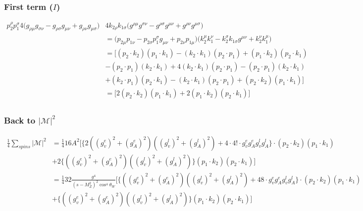 \documentclass[11pt]{article}
\begin{document}
\subsubsection{First term ($I$)}
\begin{align*} 
 p_2^{\rho} p_1^{\sigma} 4\big(
g_{\rho \mu} g_{\sigma \nu} - g_{\rho \sigma} g_{\mu \nu} + g_{\rho \nu} g_{\mu \sigma}
\Big)& 4k_{2\rho} k_{1\sigma}\Big( g^{\rho \mu} g^{\sigma \nu} - g^{\rho \sigma} g^{\mu \nu}
+ g^{\rho \nu} g^{\mu \sigma} \Big)\\
&= \big( p_{2 \mu} p_{1 \nu} - p_{2 \sigma} p_1^{ \sigma} g_{\mu \nu} + p_{2 \nu} p_{1 \mu} \Big)
\Big(k_2^{\mu} k_1^{\nu} - k_2^{\sigma} k_{1 \sigma} g^{\mu \nu} + k_2^{\nu} k_1^{\mu}\Big)\\ &= 
\Big[ (p_2 \cdot k_2) (p_1 \cdot k_1) - (k_2 \cdot k_1) (p_2 \cdot p_1) + (p_1 \cdot k_2) (p_2 \cdot k_1)\\ & - (p_2 \cdot p_1) (k_2 \cdot k_1) 
+ 4(k_2 \cdot k_1) (p_2 \cdot p_1) - (p_2 \cdot p_1) (k_2 \cdot k_1)\\ &  +(k_2 \cdot p_1) (p_2 \cdot k_1)
- (k_2 \cdot k_1) (p_2 \cdot p_1) + (p_2 \cdot k_2) (p_1 \cdot k_1) \Big]\\ &= \Big[ 2(p_2 \cdot k_2) (p_1 \cdot k_1)  + 2(p_1 \cdot k_2) (p_2 \cdot k_1) \Big]\\
\end{align*}

\subsubsection*{Back to $|\mathcal{M}|^2$}
\begin{center}
\begin{align*}
\frac{1}{4} \sum_{spins}| \mathcal{M}|^2 &= \frac{1}{4} 16 A^2 \Big[
 \{2 ((g_v^e)^2 + (g_A^e)^2)  ((g_v^l)^2 + (g_A^l)^2) + 4 \cdot 4! \cdot g_v^e g_A^e g_v^l g_A^l\} \cdot
(p_2 \cdot k_2) (p_1 \cdot k_1)\\
& + 2 \{((g_v^e)^2 + (g_A^e)^2)  ((g_v^l)^2 + (g_A^l)^2)\}(p_1 \cdot k_2) (p_2 \cdot k_1) \Big]\\
&= \frac{1}{4} 32 \frac{g^4}{(s - M_Z^2)^2\cos^4 \theta_W} \Big[
 \{((g_v^e)^2 + (g_A^e)^2)  ((g_v^l)^2 + (g_A^l)^2) + 48 \cdot g_v^e g_A^e g_v^l g_A^l\} \cdot
(p_2 \cdot k_2) (p_1 \cdot k_1)\\
& +  \{((g_v^e)^2 + (g_A^e)^2)  ((g_v^l)^2 + (g_A^l)^2)\}(p_1 \cdot k_2) (p_2 \cdot k_1) \Big]\\
\end{align*}
\end{center}
\end{document}
